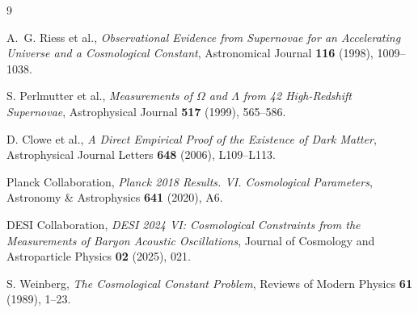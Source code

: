 \documentclass[11pt]{article}
\begin{document}
\begin{thebibliography}{9}

A.~G. Riess et al.,
\emph{Observational Evidence from Supernovae for an Accelerating Universe
and a Cosmological Constant},
Astronomical Journal \textbf{116} (1998), 1009--1038.

S. Perlmutter et al.,
\emph{Measurements of \(\Omega\) and \(\Lambda\) from 42 High-Redshift
Supernovae},
Astrophysical Journal \textbf{517} (1999), 565--586.

D. Clowe et al.,
\emph{A Direct Empirical Proof of the Existence of Dark Matter},
Astrophysical Journal Letters \textbf{648} (2006), L109--L113.

Planck Collaboration,
\emph{Planck 2018 Results. VI. Cosmological Parameters},
Astronomy \& Astrophysics \textbf{641} (2020), A6.

DESI Collaboration,
\emph{DESI 2024 VI: Cosmological Constraints from the Measurements of
Baryon Acoustic Oscillations},
Journal of Cosmology and Astroparticle Physics \textbf{02} (2025), 021.

S. Weinberg,
\emph{The Cosmological Constant Problem},
Reviews of Modern Physics \textbf{61} (1989), 1--23.

\end{thebibliography}
\end{document}
